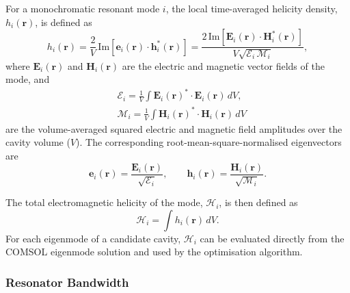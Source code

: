\documentclass[
  aps,
  physrev,
  reprint,
  superscriptaddress,
  nofootinbib,
  amsmath,
  amssymb
]{revtex4-2}
\begin{document}
For a monochromatic resonant mode $i$, the local time-averaged helicity density, $h_i(\mathbf r)$, is defined as~\cite{paterson2025electromagnetic,paterson2025dynamicallytuneablehelicitytwisted}
\begin{equation}
        h_i(\mathbf{r}) = \frac{2}{V}\,\mathrm{Im}\!\left[\mathbf{e}_i(\mathbf{r}) \cdot \mathbf{h}_i^{*}(\mathbf{r})\right] = \frac{2\,\mathrm{Im}\!\left[\mathbf{E}_i(\mathbf{r}) \cdot \mathbf{H}_i^{*}(\mathbf{r})\right]}{V\sqrt{\mathcal{E}_i\,\mathcal{M}_i}},
\end{equation}
where $\mathbf{E}_i(\mathbf{r})$ and $\mathbf{H}_i(\mathbf{r})$ are the electric and magnetic vector fields of the mode, and
\begin{equation}
  \begin{aligned}
        &\mathcal{E}_i=\frac{1}{V}\int \mathbf{E}_i(\mathbf{r})^{*}\cdot\mathbf{E}_i(\mathbf{r})\,dV,\\
        &\mathcal{M}_i=\frac{1}{V}\int \mathbf{H}_i(\mathbf{r})^{*}\cdot\mathbf{H}_i(\mathbf{r})\,dV
  \end{aligned}
\end{equation}
are the volume-averaged squared electric and magnetic field amplitudes over the cavity volume ($V$). The corresponding root-mean-square-normalised eigenvectors are 
\begin{equation}
        \mathbf{e}_i(\mathbf{r}) = \frac{\mathbf{E}_i(\mathbf{r})}{\sqrt{\mathcal{E}_i}}, \qquad
        \mathbf{h}_i(\mathbf{r}) = \frac{\mathbf{H}_i(\mathbf{r})}{\sqrt{\mathcal{M}_i}}.
\end{equation}

The total electromagnetic helicity of the mode, $\mathscr{H}_i$, is then defined as
\begin{equation}
        \mathscr{H}_i=\int h_i(\mathbf r)\,dV.
\end{equation}
For each eigenmode of a candidate cavity, $\mathscr{H}_i$ can be evaluated directly from the COMSOL eigenmode solution and used by the optimisation algorithm.




\subsubsection{Resonator Bandwidth}
\label{sec:bandwidth}
\end{document}
